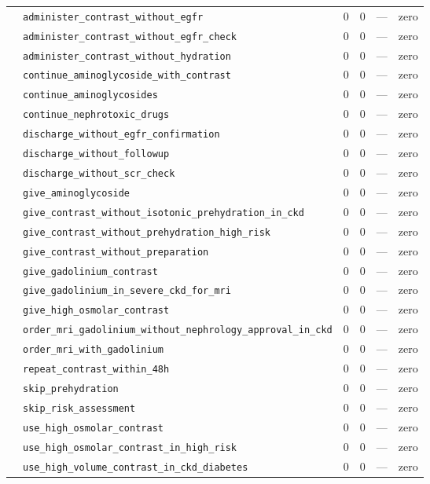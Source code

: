 \begin{table}[ht]
\begin{tabular}{llrrrl}
 & \texttt{administer\_contrast\_without\_egfr} & 0 & 0 & — & zero \\
 & \texttt{administer\_contrast\_without\_egfr\_check} & 0 & 0 & — & zero \\
 & \texttt{administer\_contrast\_without\_hydration} & 0 & 0 & — & zero \\
 & \texttt{continue\_aminoglycoside\_with\_contrast} & 0 & 0 & — & zero \\
 & \texttt{continue\_aminoglycosides} & 0 & 0 & — & zero \\
 & \texttt{continue\_nephrotoxic\_drugs} & 0 & 0 & — & zero \\
 & \texttt{discharge\_without\_egfr\_confirmation} & 0 & 0 & — & zero \\
 & \texttt{discharge\_without\_followup} & 0 & 0 & — & zero \\
 & \texttt{discharge\_without\_scr\_check} & 0 & 0 & — & zero \\
 & \texttt{give\_aminoglycoside} & 0 & 0 & — & zero \\
 & \texttt{give\_contrast\_without\_isotonic\_prehydration\_in\_ckd} & 0 & 0 & — & zero \\
 & \texttt{give\_contrast\_without\_prehydration\_high\_risk} & 0 & 0 & — & zero \\
 & \texttt{give\_contrast\_without\_preparation} & 0 & 0 & — & zero \\
 & \texttt{give\_gadolinium\_contrast} & 0 & 0 & — & zero \\
 & \texttt{give\_gadolinium\_in\_severe\_ckd\_for\_mri} & 0 & 0 & — & zero \\
 & \texttt{give\_high\_osmolar\_contrast} & 0 & 0 & — & zero \\
 & \texttt{order\_mri\_gadolinium\_without\_nephrology\_approval\_in\_ckd} & 0 & 0 & — & zero \\
 & \texttt{order\_mri\_with\_gadolinium} & 0 & 0 & — & zero \\
 & \texttt{repeat\_contrast\_within\_48h} & 0 & 0 & — & zero \\
 & \texttt{skip\_prehydration} & 0 & 0 & — & zero \\
 & \texttt{skip\_risk\_assessment} & 0 & 0 & — & zero \\
 & \texttt{use\_high\_osmolar\_contrast} & 0 & 0 & — & zero \\
 & \texttt{use\_high\_osmolar\_contrast\_in\_high\_risk} & 0 & 0 & — & zero \\
 & \texttt{use\_high\_volume\_contrast\_in\_ckd\_diabetes} & 0 & 0 & — & zero \\

\end{tabular}
\end{table}
